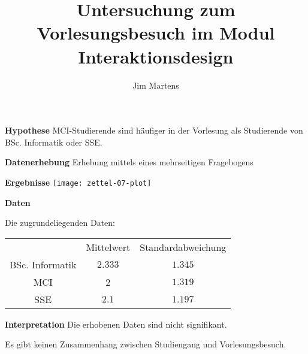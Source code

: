 \documentclass[14pt]{beamer}
\begin{document}
\author{Jim Martens}
\title{\bfseries \color{black}Untersuchung zum Vorlesungsbesuch im Modul Interaktionsdesign}

\renewcommand{\figurename}{Figure}

\begin{frame}
	\titlepage
\end{frame}

\begin{frame}{\bfseries \color{black}Hypothese}
	MCI-Studierende sind häufiger in der Vorlesung als Studierende von BSc. Informatik oder SSE.
\end{frame}

\begin{frame}{\bfseries \color{black}Datenerhebung}
	Erhebung mittels eines mehrseitigen Fragebogens
\end{frame}

\begin{frame}{\bfseries \color{black}Ergebnisse}
	\centering
	\texttt{[image: zettel-07-plot]}
\end{frame}

\begin{frame}{\bfseries \color{black}Daten}

Die zugrundeliegenden Daten:

\begin{tabular}{ccc}
	& Mittelwert & Standardabweichung \\
	BSc. Informatik & $2.333$ & $1.345$ \\
	MCI & 2 & $1.319$ \\
	SSE & $2.1$ & $1.197$ 
\end{tabular}
\end{frame}

\begin{frame}{\bfseries \color{black}Interpretation}
	Die erhobenen Daten sind nicht signifikant.
	
	Es gibt keinen Zusammenhang zwischen Studiengang und Vorlesungsbesuch.
\end{frame}
\end{document}
